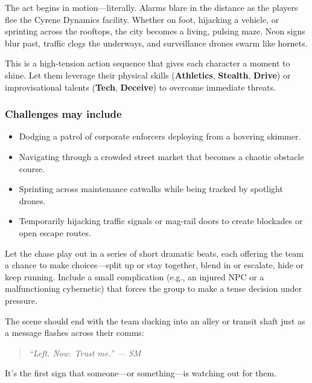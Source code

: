 \documentclass[nodeprecatedcode,bg=print]{dndbook}
\begin{document}
\begin{multicols}{2}
The act begins in motion—literally. Alarms blare in the distance as the players flee the Cyrene Dynamics facility. Whether on foot, hijacking a vehicle, or sprinting across the rooftops, the city becomes a living, pulsing maze. Neon signs blur past, traffic clogs the underways, and surveillance drones swarm like hornets.

This is a high-tension action sequence that gives each character a moment to shine. Let them leverage their physical skills (\textbf{Athletics}, \textbf{Stealth}, \textbf{Drive}) or improvisational talents (\textbf{Tech}, \textbf{Deceive}) to overcome immediate threats.

\subsubsection{Challenges may include}
\begin{itemize}
    \item Dodging a patrol of corporate enforcers deploying from a hovering skimmer.
    \item Navigating through a crowded street market that becomes a chaotic obstacle course.
    \item Sprinting across maintenance catwalks while being tracked by spotlight drones.
    \item Temporarily hijacking traffic signals or mag-rail doors to create blockades or open escape routes.
\end{itemize}

\begin{GmTips}
    Let the chase play out in a series of short dramatic beats, each offering the team a chance to make choices—split up or stay together, blend in or escalate, hide or keep running. Include a small complication (e.g., an injured NPC or a malfunctioning cybernetic) that forces the group to make a tense decision under pressure.
\end{GmTips}

The scene should end with the team ducking into an alley or transit shaft just as a message flashes across their comms:

\vspace{0.5\baselineskip}
\begin{quote}
\textit{“Left. Now. Trust me.” — SM}
\end{quote}
\vspace{0.5\baselineskip}

It’s the first sign that someone—or something—is watching out for them.



\end{multicols}
\end{document}
